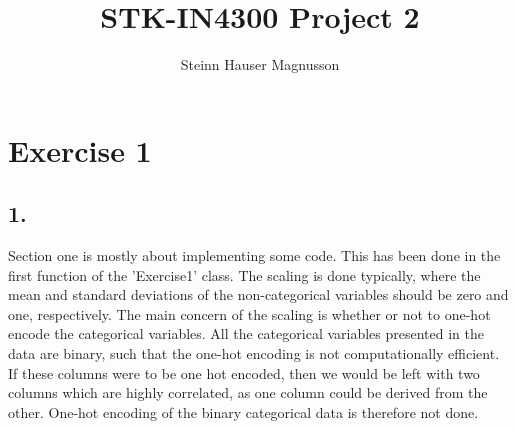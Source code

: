 \documentclass[]{article}
\title{STK-IN4300 Project 2}
\author{Steinn Hauser Magnusson}
\begin{document}
\maketitle

\section*{Exercise 1}
\subsection*{1.}
Section one is mostly about implementing some code. This has been done in the first function of the 'Exercise1' class. The scaling is done typically, where the mean and standard deviations of the non-categorical variables should be zero and one, respectively. The main concern of the scaling is whether or not to one-hot encode the categorical variables. All the categorical variables presented in the data are binary, such that the one-hot encoding is not computationally efficient. If these columns were to be one hot encoded, then we would be left with two columns which are highly correlated, as one column could be derived from the other. One-hot encoding of the binary categorical data is therefore not done.
\end{document}
